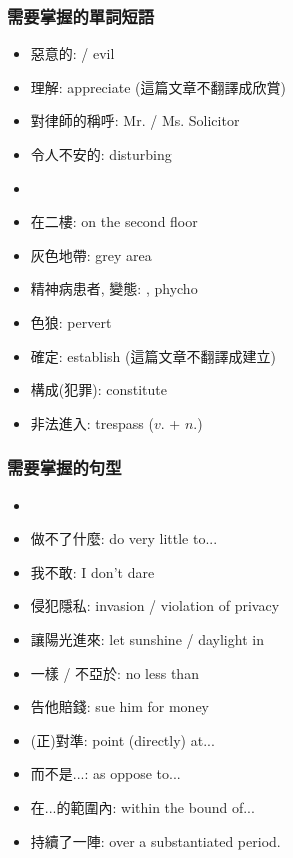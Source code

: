 \subsubsection*{需要掌握的單詞短語}
\begin{multicols}{2}
\begin{itemize}
  \itemsep0em
  \item 惡意的:  / evil
  \item 理解: appreciate (這篇文章不翻譯成欣賞)
  \item 對律師的稱呼: Mr. / Ms. Solicitor
  \item 令人不安的: disturbing
  \item {}
  \item 在二樓: on the second floor
  \item 灰色地帶: grey area
  \item 精神病患者, 變態: , phycho
  \item 色狼: pervert
  \item 確定: establish (這篇文章不翻譯成建立)
  \item 構成(犯罪): constitute
  \item 非法進入: trespass ($v.$ + $n.$)
\end{itemize}
\end{multicols}

\subsubsection*{需要掌握的句型}
\begin{multicols}{2}
\begin{itemize}
  \itemsep0em
  \item {}
  \item 做不了什麼: do very little to...
  \item 我不敢: I don't dare
  \item 侵犯隱私: invasion / violation of privacy
  \item 讓陽光進來: let sunshine / daylight in
  \item 一樣 / 不亞於: no less than
  \item 告他賠錢: sue him for money
  \item (正)對準: point (directly) at...
  \item 而不是...: as oppose to...
  \item 在...的範圍內: within the bound of...
  \item 持續了一陣: over a substantiated period.
\end{itemize}
\end{multicols}

